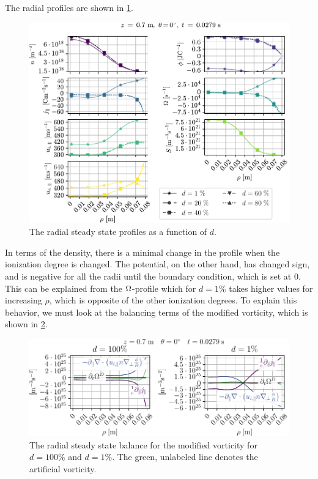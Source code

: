The radial profiles are shown in \cref{fig:nnScanRad}.
%
\begin{figure}[htb]
    \centering
    \includegraphics{fig/results/neutral/nnScanRad}
    \caption{The radial steady state profiles as a function of $d$.}
    \label{fig:nnScanRad}
\end{figure}
%
In terms of the density, there is a minimal change in the profile when the ionization degree is changed.
The potential, on the other hand, has changed sign, and is negative for all the radii until the boundary condition, which is set at $0$.
This can be explained from the $\Omega$-profile which for $d=1\%$ takes higher values for increasing $\rho$, which is opposite of the other ionization degrees.
To explain this behavior, we must look at the balancing terms of the modified vorticity, which is shown in \cref{fig:nnScanVortDRad}.
%
\begin{figure}[h!]
    \centering
    \includegraphics{fig/results/neutral/vortDBalanceNnCompareRad}
    \caption{The radial steady state balance for the modified vorticity for $d=100\%$ and $d=1\%$.
        The green, unlabeled line denotes the artificial vorticity.
    }
    \label{fig:nnScanVortDRad}
\end{figure}
